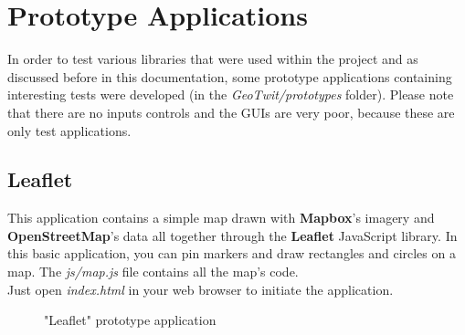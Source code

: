\documentclass[a4paper,11pt]{report}
\begin{document}
\section{Prototype Applications}
\label{prototypeApplications}
In order to test various libraries that were used within the project and as discussed before in this documentation, some prototype applications containing interesting tests were developed (in the \emph{GeoTwit/prototypes} folder). Please note that there are no inputs controls and the GUIs are very poor, because these are only test applications.

\subsection{Leaflet}
This application contains a simple map drawn with \textbf{Mapbox}'s imagery and \textbf{OpenStreetMap}'s data all together through the \textbf{Leaflet} JavaScript library. In this basic application, you can pin markers and draw rectangles and circles on a map. The \emph{js/map.js} file contains all the map's code.\\

Just open \emph{index.html} in your web browser to initiate the application.
\begin{figure}[H]
\vspace{-5pt}
\begin{center}
\vspace{-20pt}
\caption{"Leaflet" prototype application}
\end{center}
\end{figure}
\end{document}
